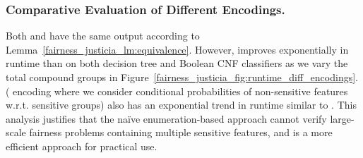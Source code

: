 \subsubsection{Comparative Evaluation of Different Encodings.}
Both {\justiciaenum} and {\justicialearn}  have the same output according to Lemma~\ref{fairness_justicia_lm:equivalence}. However, {\justicialearn}  improves exponentially  in runtime  than {\justiciaenum} on both decision tree and Boolean CNF classifiers as we vary the total compound groups in Figure~\ref{fairness_justicia_fig:runtime_diff_encodings}. {\justiciacond} ({\justiciaenum} encoding where we consider conditional probabilities of non-sensitive features w.r.t. sensitive groups) also has an exponential trend in runtime similar to {\justiciaenum}.  This analysis justifies that the na\"ive enumeration-based approach cannot verify large-scale fairness problems containing multiple sensitive features, and {\justicialearn} is a more efficient approach for practical use.









